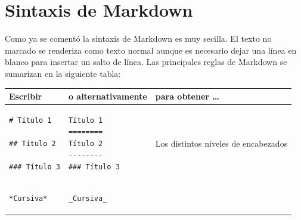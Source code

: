 \documentclass[]{book}
\theoremstyle{definition}
\theoremstyle{definition}
\theoremstyle{definition}
\theoremstyle{remark}
\begin{document}
\section{Sintaxis de Markdown}\label{markdown}

Como ya se comentó la sintaxis de Markdown es muy secilla. El texto no
marcado se renderiza como texto normal aunque es necesario dejar una
línea en blanco para insertar un salto de línea. Las principales reglas
de Markdown se sumarizan en la siguiente tabla:

\begin{longtable}[]{@{}lll@{}}
\toprule
\begin{minipage}[b]{0.29\columnwidth}\raggedright\strut
Escribir\strut
\end{minipage} & \begin{minipage}[b]{0.33\columnwidth}\raggedright\strut
o alternativamente\strut
\end{minipage} & \begin{minipage}[b]{0.29\columnwidth}\raggedright\strut
para obtener \ldots{}\strut
\end{minipage}\tabularnewline
\midrule
\endhead
\begin{minipage}[t]{0.32\columnwidth}\raggedright\strut
\begin{verbatim}
# Título 1
 
## Título 2
 
### Título 3
\end{verbatim}
\strut
\end{minipage} & \begin{minipage}[t]{0.32\columnwidth}\raggedright\strut
\begin{verbatim}
Título 1
========
Título 2
--------
### Título 3
\end{verbatim}
\strut
\end{minipage} & \begin{minipage}[t]{0.32\columnwidth}\raggedright\strut
Los distintos niveles de encabezados\strut
\end{minipage}\tabularnewline
\begin{minipage}[t]{0.32\columnwidth}\raggedright\strut
\begin{verbatim}
*Cursiva*
\end{verbatim}
\strut
\end{minipage} & \begin{minipage}[t]{0.32\columnwidth}\raggedright\strut
\begin{verbatim}
_Cursiva_
\end{verbatim}
\strut
\end{minipage} & \begin{minipage}[t]{0.32\columnwidth}\raggedright\strut

\end{minipage}
\end{longtable}
\end{document}
